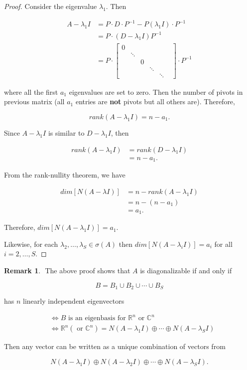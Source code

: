 \documentclass[12pt]{article}
\theoremstyle{definition}
\newtheorem*{remark}{Remark}
\begin{document}
\begin{proof}
Consider the eigenvalue $\lambda_1$. Then

\begin{align*}
A - \lambda_1 I &= P \cdot D \cdot P^{-1} - P (\lambda_1 I ) \cdot P^{-1} \\
&= P \cdot ( D - \lambda_1 I) P^{-1} \\
&=
P \cdot
\begin{bmatrix}
0 & & & & \\
& \ddots & & & \\
& & 0 & & & \\
& & & \ddots & \\
& & & & \ddots 
\end{bmatrix}
\cdot P^{-1} 
\end{align*}

where all the first $a_1$ eigenvalues are set to zero. Then the number of pivots in
previous matrix (all $a_1$ entries are \textbf{not} pivots but all others are). Therefore,

\[ rank(A - \lambda_1 I) = n - a_1. \]

Since $A - \lambda_1 I$ is similar to $D - \lambda_1 I$, then

\begin{align*}
rank(A - \lambda_1 I) &= rank( D - \lambda_1 I) \\
&= n - a_1.
\end{align*}

From the rank-nullity theorem, we have

\begin{align*}
dim[N(A - \lambda I)] &= n - rank(A - \lambda_1 I) \\
&= n - (n - a_1) \\
&= a_1. 
\end{align*}

Therefore, $dim[N(A - \lambda_1 I)] = a_1$.

Likewise, for each $\lambda_2, \ldots, \lambda_S \in \sigma(A)$ then
$dim[N(A - \lambda_i I)] = a_i$ for all $i = 2, \ldots, S$. 
\end{proof}

\begin{remark} $ $
The above proof shows that $A$ is diagonalizable if and only if

\[B = B_1 \cup B_2 \cup \cdots \cup B_S \]

has $n$ linearly independent eigenvectors

\begin{align*}
&\iff B \text{ is an eigenbasis for } \mathbb{R}^n \text{ or } \mathbb{C}^n \\
&\iff \mathbb{R}^n (\text{ or } \mathbb{C}^n) = N(A - \lambda_1 I) \oplus \cdots
\oplus N(A - \lambda_S I)
\end{align*}

Then any vector can be written as a unique combination of vectors from

\[ N(A - \lambda_1 I) \oplus N(A - \lambda_2 I) \oplus \cdots \oplus N(A - \lambda_S I). \]

\end{remark}
\end{document}
